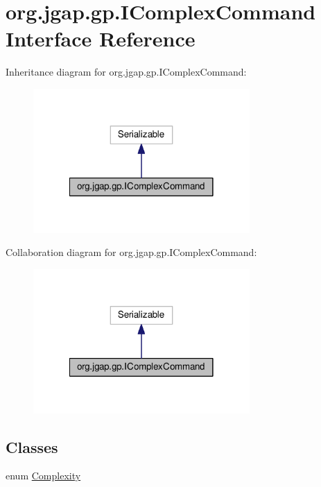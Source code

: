 \hypertarget{interfaceorg_1_1jgap_1_1gp_1_1_i_complex_command}{\section{org.\-jgap.\-gp.\-I\-Complex\-Command Interface Reference}
\label{interfaceorg_1_1jgap_1_1gp_1_1_i_complex_command}
}


Inheritance diagram for org.\-jgap.\-gp.\-I\-Complex\-Command\-:
\nopagebreak
\begin{figure}[H]
\begin{center}
\leavevmode
\includegraphics[width=234pt]{interfaceorg_1_1jgap_1_1gp_1_1_i_complex_command__inherit__graph}
\end{center}
\end{figure}


Collaboration diagram for org.\-jgap.\-gp.\-I\-Complex\-Command\-:
\nopagebreak
\begin{figure}[H]
\begin{center}
\leavevmode
\includegraphics[width=234pt]{interfaceorg_1_1jgap_1_1gp_1_1_i_complex_command__coll__graph}
\end{center}
\end{figure}
\subsection*{Classes}
\begin{DoxyCompactItemize}
\item 
enum \hyperlink{enumorg_1_1jgap_1_1gp_1_1_i_complex_command_1_1_complexity}{Complexity}
\end{DoxyCompactItemize}
